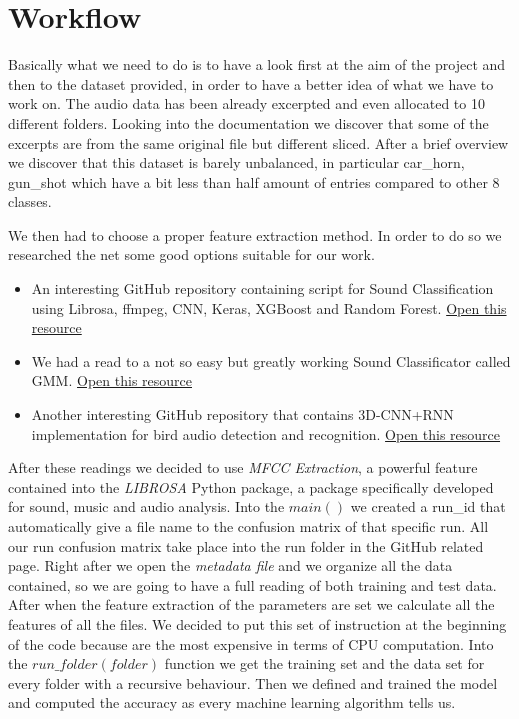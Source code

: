 \documentclass{article}
\begin{document}
\section*{Workflow}
Basically what we need to do is to have a look first at the aim of the project and then to the dataset provided, in order to have a better idea of what we have to work on.
The audio data has been already excerpted and even allocated to 10 different folders. Looking into the documentation we discover that some of the excerpts are from the same original file but different sliced.
After a brief overview we discover that this dataset is barely unbalanced, in particular car\_horn, gun\_shot which have a bit less than half amount of entries compared to other 8 classes.

We then had to choose a proper feature extraction method. In order to do so we researched the net some good options suitable for our work.
\begin{itemize}
  \item An interesting GitHub repository containing script for Sound Classification using Librosa, ffmpeg, CNN, Keras, XGBoost and Random Forest. \hyperlink{https://github.com/ravising-h/Urbansound8k}{Open this resource}
  \item We had a read to a not so easy but greatly working Sound Classificator called GMM. \hyperlink{https://towardsdatascience.com/gaussian-mixture-modelling-gmm-833c88587c7f}{Open this resource}
  \item Another interesting GitHub repository that contains 3D-CNN+RNN implementation for bird audio detection and recognition. \hyperlink{https://github.com/himaivan/BAD2}{Open this resource}
\end{itemize}

After these readings we decided to use \emph{MFCC Extraction}, a powerful feature contained into the \emph{LIBROSA} Python package, a package specifically developed for sound, music and audio analysis.
\newline
\newline
Into the $main()$ we created a run\_id that automatically give a file name to the confusion matrix of that specific run. All our run confusion matrix take place into the run folder in the GitHub related page.
Right after we open the \emph{metadata file} and we organize all the data contained, so we are going to have a full reading of both training and test data. After when the feature extraction of the parameters are set we calculate all the features of all the files. We decided to put this set of instruction at the beginning of the code because are the most expensive in terms of CPU computation.
\newline
\newline
Into the $run\_folder(folder)$ function we get the training set and the data set for every folder with a recursive behaviour. Then we defined and trained the model and computed the accuracy as every machine learning algorithm tells us.\break
\end{document}
